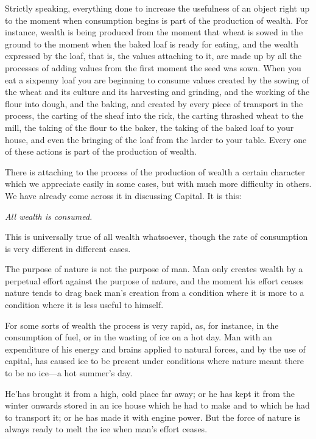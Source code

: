 \documentclass{book}
\begin{document}
Strictly speaking, everything done to increase the usefulness of an object right up to the moment when consumption begins is part of the production of wealth. For instance, wealth is being produced from the moment that wheat is sowed in the ground to the moment when the baked loaf is ready for eating, and the wealth expressed by the loaf, that is, the values attaching to it, are made up by all the processes of adding values from the first moment the seed was sown. When you eat a sixpenny loaf you are beginning to consume values created by the sowing of the wheat and its culture and its harvesting and grinding, and the working of the flour into dough, and the baking, and created by every piece of transport in the process, the carting of the sheaf into the rick, the carting thrashed wheat to the mill, the taking of the flour to the baker, the taking of the baked loaf to your house, and even the bringing of the loaf from the larder to your table. Every one of these actions is part of the production of wealth.

There is attaching to the process of the production of wealth a certain character which we appreciate easily in some cases, but with much more difficulty in others. We have already come across it in discussing Capital. It is this:

\emph{All wealth is consumed.}

This is universally true of all wealth whatsoever, though the rate of consumption is very different in different cases.

The purpose of nature is not the purpose of man. Man only creates wealth by a perpetual effort against the purpose of nature, and the moment his effort ceases nature tends to drag back man’s creation from a condition where it is more to a condition where it is less useful to himself.

For some sorts of wealth the process is very rapid, as, for instance, in the consumption of fuel, or in the wasting of ice on a hot day. Man with an expenditure of his energy and brains applied to natural forces, and by the use of capital, has caused ice to be present under conditions where nature meant there to be no ice—a hot summer’s day.

He’has brought it from a high, cold place far away; or he has kept it from the winter onwards stored in an ice house which he had to make and to which he had to transport it; or he has made it with engine power. But the force of nature is always ready to melt the ice when man’s effort ceases.
\end{document}
